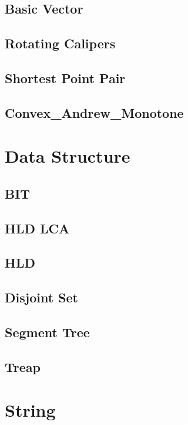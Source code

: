 	\subsection{Basic Vector}
		
	\subsection{Rotating Calipers}
		
	\subsection{Shortest Point Pair}
		
	\subsection{Convex\_Andrew\_Monotone}
		
\section{Data Structure}
	\subsection{BIT}
		
	\subsection{HLD LCA}
		
	\subsection{HLD}
		
	\subsection{Disjoint Set}
		
	\subsection{Segment Tree}
		
	\subsection{Treap}
		
\section{String}
